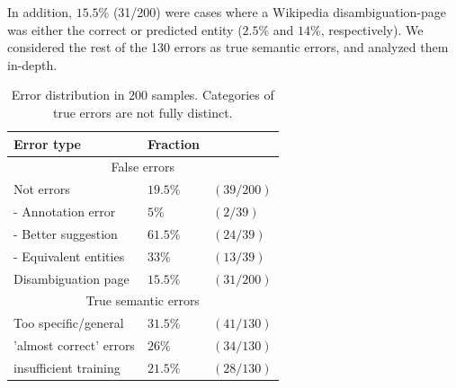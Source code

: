 \documentclass[11pt,a4paper]{article}
\begin{document}
	In addition, $15.5\%$ (31/200) were cases where a Wikipedia disambiguation-page was either the correct or predicted entity ($2.5\%$ and $14\%$, respectively). We considered the rest of the 130 errors as true semantic errors, and analyzed them in-depth.
	
	\begin{table}[ht]
		\begin{center}
			\begin{tabular}{|p{3.5cm}| ll |}
				\hline \bf Error type 		& \bf Fraction  	&\\ 
				\hline \multicolumn{3}{|c|}{False errors} \\
				\hline Not errors 			& $19.5\%$ 	& $(39/200)$  \\ 
				- Annotation error 			& $5\%$    	& $(2/39)$ \\ 
				- Better suggestion			& $61.5\%$ 	&$(24/39)$ \\
			    - Equivalent entities		& $ 33\%$ 	&$(13/39)$ \\ 
				Disambiguation page			& $15.5\%$   	&$(31/200)$ \\ 
				\hline \multicolumn{3}{|c|}{True semantic errors} \\
				\hline	Too specific/general  	& $31.5\%$ 	&$(41/130)$ \\ 
				'almost correct' errors		& $26\%$ 	&$(34/130)$ \\ 
				insufficient training		& $21.5\%$ &$(28/130)$ \\
				\hline
			\end{tabular}
		\end{center}
		\caption{\label{tab:d} Error distribution in $200$ samples. Categories of true errors are not fully distinct.}
	\end{table}
	
\end{document}
